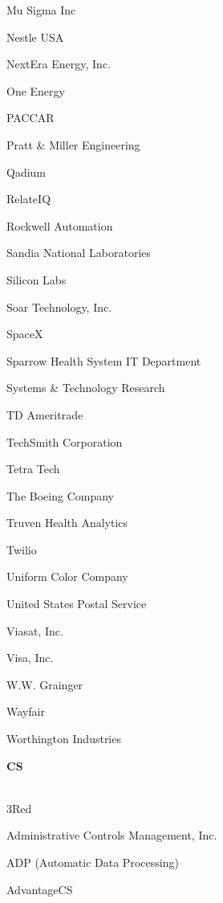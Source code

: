 \documentclass[twoside]{article}
\begin{document}
\begin{center}
\begin{multicols}{5}
\begin{FlushLeft}
\begin{compactitem}
\item Mu Sigma Inc
\item Nestle USA
\item NextEra Energy, Inc.
\item One Energy
\item PACCAR
\item Pratt \& Miller Engineering
\item Qadium
\item RelateIQ
\item Rockwell Automation
\item Sandia National Laboratories
\item Silicon Labs
\item Soar Technology, Inc.
\item SpaceX
\item Sparrow Health System IT Department
\item Systems \& Technology Research
\item TD Ameritrade
\item TechSmith Corporation
\item Tetra Tech
\item The Boeing Company
\item Truven Health Analytics
\item Twilio
\item Uniform Color Company
\item United States Postal Service
\item Viasat, Inc.
\item Visa, Inc.
\item W.W. Grainger
\item Wayfair
\item Worthington Industries
\end{compactitem}
        \end{FlushLeft}
        \vspace{1em}
        {\fontsize{14}{16}\selectfont \bf CS}\\
        \vspace{-1em}
        ~\hrulefill~
        \vspace{-.9em}
        \begin{FlushLeft}
        \begin{compactitem}
        \item 3Red
\item Administrative Controls Management, Inc.
\item ADP (Automatic Data Processing)
\item AdvantageCS

\end{compactitem}
\end{FlushLeft}
\end{multicols}
\end{center}
\end{document}
